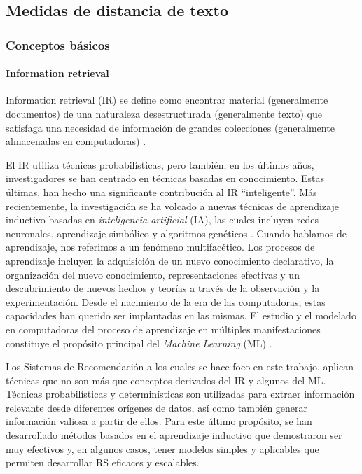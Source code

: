 \subsection{Medidas de distancia de texto}
\subsubsection{Conceptos básicos}
\paragraph{Information retrieval}
Information retrieval (IR) se define como encontrar material (generalmente documentos) de una naturaleza desestructurada (generalmente texto) que satisfaga una necesidad de información de grandes colecciones (generalmente almacenadas en computadoras) \citep{schutze2008introduction}.

\bigskip El IR utiliza técnicas probabilísticas, pero también, en los últimos años, investigadores se han centrado en técnicas basadas en conocimiento. Estas últimas, han hecho una significante contribución al IR “inteligente”. Más recientemente, la investigación se ha volcado a nuevas técnicas de aprendizaje inductivo basadas en \textit{inteligencia artificial} (IA), las cuales incluyen redes neuronales, aprendizaje simbólico y algoritmos genéticos \citep{chen1995machine}. Cuando hablamos de aprendizaje, nos referimos a un fenómeno multifacético. Los procesos de aprendizaje incluyen la adquisición de un nuevo conocimiento declarativo, la organización del nuevo conocimiento, representaciones efectivas y un descubrimiento de nuevos hechos y teorías a través de la observación y la experimentación. Desde el nacimiento de la era de las computadoras, estas capacidades han querido ser implantadas en las mismas. El estudio y el modelado en computadoras del proceso de aprendizaje en múltiples manifestaciones constituye el propósito principal del \textit{Machine Learning} (ML) \citep{mitchell2013artificial}.

\bigskip Los Sistemas de Recomendación a los cuales se hace foco en este trabajo, aplican técnicas que no son más que conceptos derivados del IR y algunos del ML. Técnicas probabilísticas y determinísticas son utilizadas para extraer información relevante desde diferentes orígenes de datos, así como también generar información valiosa a partir de ellos. Para este último propósito, se han desarrollado métodos basados en el aprendizaje inductivo que demostraron ser muy efectivos y, en algunos casos, tener modelos simples y aplicables que permiten desarrollar RS eficaces y escalables.

